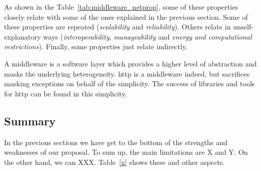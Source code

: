 As shown in the Table~\ref{tab:middleware_netprop}, some of these properties closely relate with some of the ones explained in the previous section.
Some of these properties are repeated (\emph{scalability} and \emph{reliability}).
Others relate in unself-explanatory ways (\emph{interoperability}, \emph{manageability} and \emph{energy and computational restrictions}).
Finally, some properties just relate indirectly.









A middleware is a software layer which provides a higher level of abstraction and masks the underlying heterogeneity.
\ac{http} is a middleware indeed, but sacrifices masking exceptions on behalf of the simplicity. %
The success of libraries and tools for \ac{http} can be found in this simplicity.





\subsection{Summary}
\label{sec:middleware_eval_summary}

In the previous sections we have get to the bottom of the strengths and weaknesses of our proposal.
To sum up, the main limitations are X and Y.
On the other hand, we can XXX.
Table~\ref{x} shows these and other aspects.


